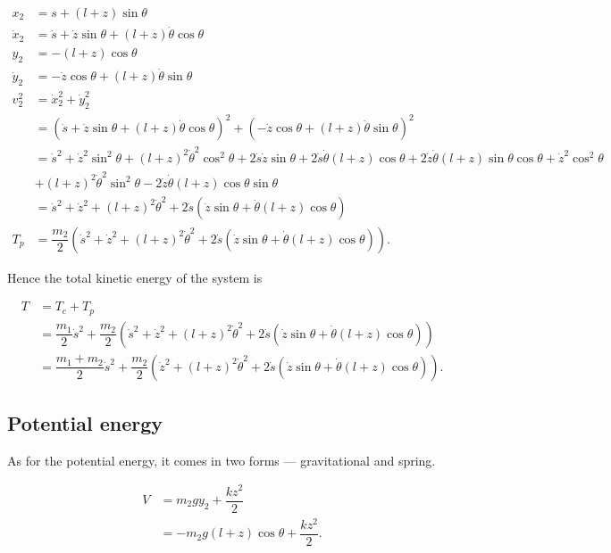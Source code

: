 \documentclass[12pt,a4paper,portrait]{article}
\begin{document}
\begin{align*}
	x_2 &= s + (l+z)\sin{\theta} \\
	\dot{x}_2 &= \dot{s} + \dot{z}\sin{\theta} + (l+z)\dot{\theta}\cos{\theta}\\
	y_2 &= -(l+z)\cos{\theta} \\
	\dot{y}_2 &= -\dot{z}\cos{\theta} + (l+z)\dot{\theta}\sin{\theta} \\
	v_2^2 &= \dot{x}_2^2 + \dot{y}_2^2 \\
	&= (\dot{s} + \dot{z}\sin{\theta} + (l+z)\dot{\theta}\cos{\theta})^2 + (-\dot{z}\cos{\theta} + (l+z)\dot{\theta}\sin{\theta})^2 \\
	&= \dot{s}^2 + \dot{z}^2 \sin^2{\theta} + (l+z)^2\dot{\theta}^2\cos^2{\theta} + 2\dot{s}\dot{z}\sin{\theta} + 2\dot{s}\dot{\theta}(l+z)\cos{\theta} + 2\dot{z}\dot{\theta}(l+z)\sin{\theta}\cos{\theta} + \dot{z}^2\cos^2{\theta} \\
	&+ (l+z)^2\dot{\theta}^2\sin^2{\theta} - 2\dot{z}\dot{\theta}(l+z)\cos{\theta}\sin{\theta}\\
	&= \dot{s}^2 + \dot{z}^2 + (l+z)^2\dot{\theta}^2 + 2\dot{s}(\dot{z}\sin{\theta} + \dot{\theta}(l+z)\cos{\theta})\\
	T_p &= \dfrac{m_2}{2} \left(\dot{s}^2 + \dot{z}^2 + (l+z)^2\dot{\theta}^2 + 2\dot{s}(\dot{z}\sin{\theta} + \dot{\theta}(l+z)\cos{\theta})\right).
\end{align*}

Hence the total kinetic energy of the system is

\begin{align*}
	T &= T_c + T_p \\
	&= \dfrac{m_1}{2}\dot{s}^2 + \dfrac{m_2}{2} \left(\dot{s}^2 + \dot{z}^2 + (l+z)^2\dot{\theta}^2 + 2\dot{s}(\dot{z}\sin{\theta} + \dot{\theta}(l+z)\cos{\theta})\right) \\
	&= \dfrac{m_1+m_2}{2} \dot{s}^2 + \dfrac{m_2}{2}\left(\dot{z}^2 + (l+z)^2\dot{\theta}^2 + 2\dot{s}(\dot{z}\sin{\theta} + \dot{\theta}(l+z)\cos{\theta})\right).
\end{align*}

\subsection{Potential energy}
As for the potential energy, it comes in two forms --- gravitational and spring. 

\begin{align*}
	V &= m_2 g y_2 + \dfrac{kz^2}{2}\\
	&= -m_2g(l+z)\cos{\theta} + \dfrac{kz^2}{2}.
\end{align*}
\end{document}
